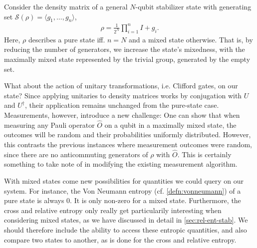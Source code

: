 Consider the density matrix of a general $N$-qubit stabilizer
state with generating set $\mathcal{S}\left( \rho \right) = \langle g_1, \ldots, g_n
\rangle$,
\begin{align}
  \rho = \frac{1}{2^N} \prod_{i=1}^n I + g_i
.\end{align}
Here, $\rho$ describes a pure state iff. $n=N$ and a mixed state otherwise.
That is, by reducing the number of generators, we increase the state's
mixedness, with the maximally mixed state represented by the trivial group,
generated by the empty set.

What about the action of unitary transformations, i.e. Clifford gates, on our
state? Since applying unitaries to density matrices works by conjugation with
$U$ and $U^\dagger$, their application remains unchanged from the pure-state
case. Measurements, however, introduce a new challenge:
One can show that when measuring any
Pauli operator $\hat{O}$ on a qubit in a maximally mixed state, the outcomes
will be random and their probabilities uniformly distributed. However, this
contrasts the previous instances where measurement outcomes were random, since
there are no anticommuting generators of $\rho$ with $\hat{O}$. This is
certainly something to take note of in modifying the existing measurement
algorithm.

With mixed states come new possibilities for quantities we could query on our
system. For instance, the Von Neumann entropy (cf. \cref{defn:vonneumann}) of a
pure state is always $0$. It is only non-zero for a mixed state.
Furthermore, the cross and relative entropy only
really get particularily interesting when considering mixed states, as we have
discussed in detail in \cref{sec:rel-ent-stab}. We should therefore include the
ability to access these entropic quantities, and also compare two states to
another, as is done for the cross and relative entropy.

